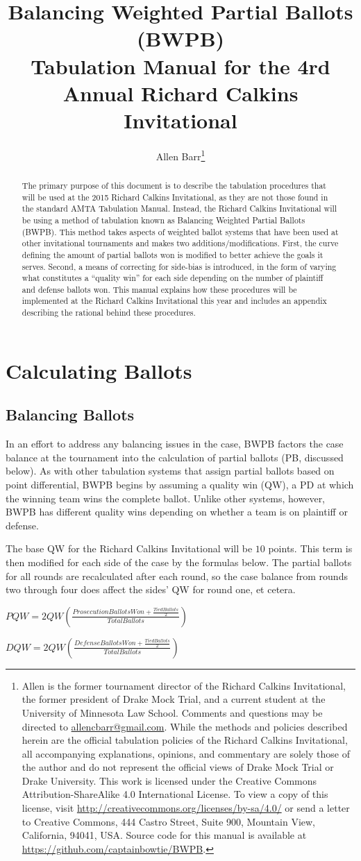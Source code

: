 \documentclass{article}
\title{\textbf{Balancing Weighted Partial Ballots (BWPB)}\\ \large  Tabulation Manual for the 4rd Annual Richard Calkins Invitational}
\author{Allen Barr\footnote{Allen is the former tournament director of the Richard Calkins Invitational, the former president of Drake Mock Trial, and a current student at the University of Minnesota Law School.  Comments and questions may be directed to \href{mailto:allencbarr@gmail.com}{allencbarr@gmail.com}.  While the methods and policies described herein are the official tabulation policies of the Richard Calkins Invitational, all accompanying explanations, opinions, and commentary are solely those of the author and do not represent the official views of Drake Mock Trial  or Drake University.  This work is licensed under the Creative Commons Attribution-ShareAlike 4.0 International License. To view a copy of this license, visit \url{http://creativecommons.org/licenses/by-sa/4.0/} or send a letter to Creative Commons, 444 Castro Street, Suite 900, Mountain View, California, 94041, USA. Source code for this manual is available at \url{https://github.com/captainbowtie/BWPB}.}}
\begin{document}
\maketitle
\begin{abstract}
The primary purpose of this document is to describe the tabulation procedures that will be used at the 2015 Richard Calkins Invitational, as they are not those found in the standard AMTA Tabulation Manual.  Instead, the Richard Calkins Invitational will be using a method of tabulation known as Balancing Weighted Partial Ballots (BWPB).  This method takes aspects of weighted ballot systems that have been used at other invitational tournaments and makes two additions/modifications.  First, the curve defining the amount of partial ballots won is modified to better achieve the goals it serves.  Second, a means of correcting for side-bias is introduced, in the form of varying what constitutes a ``quality win'' for each side depending on the number of plaintiff and defense ballots won.  This manual explains how these procedures will be implemented at the Richard Calkins Invitational this year and includes an appendix describing the rational behind these procedures.
\end{abstract}
\section{Calculating Ballots}
\subsection{Balancing Ballots}
In an effort to address any balancing issues in the case, BWPB factors the case balance at the tournament into the calculation of partial ballots (PB, discussed below). As with other tabulation systems that assign partial ballots based on point differential, BWPB begins by assuming a quality win (QW), a PD at which the winning team wins the complete ballot. Unlike other systems, however, BWPB has different quality wins depending on whether a team is on plaintiff or defense.

The base QW for the Richard Calkins Invitational will be $10$ points. This term is then modified for each side of the case by the formulas below. The partial ballots for all rounds are recalculated after each round, so the case balance from rounds two through four does affect the sides' QW for round one, et cetera.
\begin{center}
$PQW=2QW\left(\frac{ProsecutionBallotsWon+\frac{TiedBallots}{2}}{TotalBallots}\right)$

$DQW=2QW\left(\frac{DefenseBallotsWon+\frac{TiedBallots}{2}}{TotalBallots}\right)$
\end{center}
\end{document}
